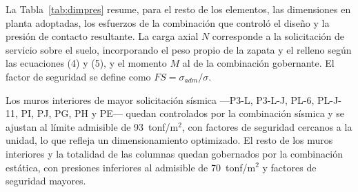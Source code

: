 La Tabla~\ref{tab:dimpres} resume, para el resto de los elementos, las dimensiones en planta adoptadas, los esfuerzos de la combinación que controló el diseño y la presión de contacto resultante. La carga axial $N$ corresponde a la solicitación de servicio sobre el suelo, incorporando el peso propio de la zapata y el relleno según las ecuaciones (4) y (5), y el momento $M$ al de la combinación gobernante. El factor de seguridad se define como $FS = \sigma_{adm}/\sigma$.

Los muros interiores de mayor solicitación sísmica —P3-L, P3-L-J, PL-6, PL-J-11, PI, PJ, PG, PH y PE— quedan controlados por la combinación sísmica y se ajustan al límite admisible de 93~tonf/m$^2$, con factores de seguridad cercanos a la unidad, lo que refleja un dimensionamiento optimizado. El resto de los muros interiores y la totalidad de las columnas quedan gobernados por la combinación estática, con presiones inferiores al admisible de 70~tonf/m$^2$ y factores de seguridad mayores.

